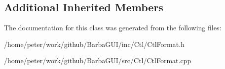 \subsection*{Additional Inherited Members}


The documentation for this class was generated from the following files\+:\begin{DoxyCompactItemize}
\item 
/home/peter/work/github/\+Barba\+G\+U\+I/inc/\+Ctl/Ctl\+Format.\+h\item 
/home/peter/work/github/\+Barba\+G\+U\+I/src/\+Ctl/Ctl\+Format.\+cpp\end{DoxyCompactItemize}
